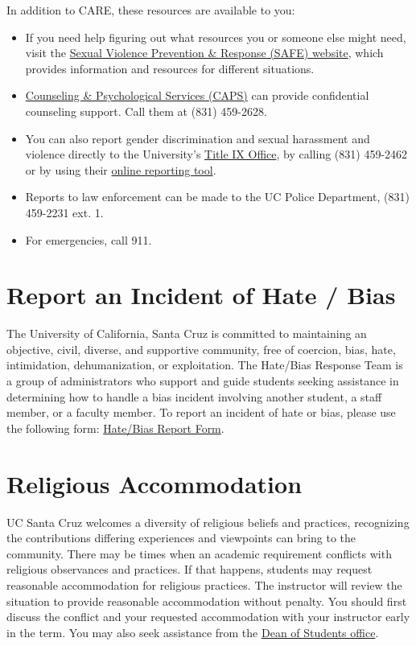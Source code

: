 \documentclass[12pt]{article}
\begin{document}
In addition to CARE, these resources are available to you:
\begin{itemize}
	\item If you need help figuring out what resources you or someone else might need, visit the \href{http://safe.ucsc.edu/}{Sexual Violence Prevention \& Response (SAFE) website}, which provides information and resources for different situations.
	\item \href{https://caps.ucsc.edu/}{Counseling \& Psychological Services (CAPS)} can provide confidential counseling support. Call them at (831) 459-2628.
	\item You can also report gender discrimination and sexual harassment and violence directly to the University's \href{https://titleix.ucsc.edu/}{Title IX Office}, by calling (831) 459-2462 or by using their \href{https://titleix.ucsc.edu/about/staff-contact-us.html}{online reporting tool}.
	\item Reports to law enforcement can be made to the UC Police Department, (831) 459-2231 ext. 1.
	\item For emergencies, call 911.	
\end{itemize}

\section{Report an Incident of Hate / Bias}
The University of California, Santa Cruz is committed to maintaining an objective, civil, diverse, and supportive community, free of coercion, bias, hate, intimidation, dehumanization, or exploitation. The Hate/Bias Response Team is a group of administrators who support and guide students seeking assistance in determining how to handle a bias incident involving another student, a staff member, or a faculty member. To report an incident of hate or bias, please use the following form: \href{https://ucsc-advocate.symplicity.com/care_report/index.php/}{Hate/Bias Report Form}.

\section{Religious Accommodation}
UC Santa Cruz welcomes a diversity of religious beliefs and practices, recognizing the contributions differing experiences and viewpoints can bring to the community. There may be times when an academic requirement conflicts with religious observances and practices. If that happens, students may request reasonable accommodation for religious practices. The instructor will review the situation to provide reasonable accommodation without penalty. You should first discuss the conflict and your requested accommodation with your instructor early in the term. You may also seek assistance from the \href{https://deanofstudents.ucsc.edu/}{Dean of Students office}.
\end{document}
